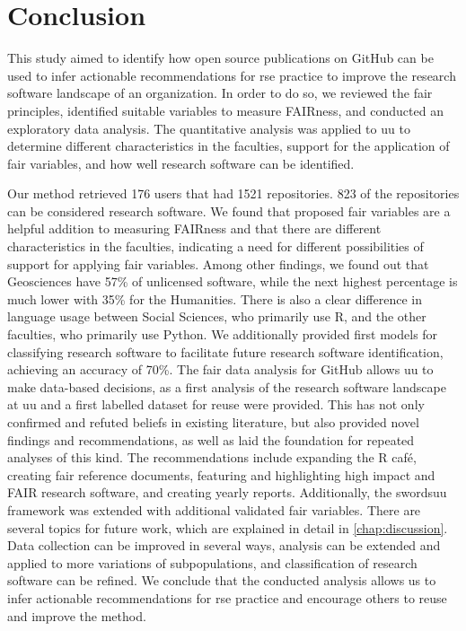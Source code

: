 \titlespacing{\chapter}{0pt}{-60pt}{0pt}
\chapter{Conclusion}
\label{chap:conclusion}
\enlargethispage{\baselineskip}
This study aimed to identify how open source publications on GitHub can be used to infer actionable recommendations for \acrshort{rse} practice to improve the research software landscape of an organization. 
In order to do so, we reviewed the \acrshort{fair} principles, identified suitable variables to measure FAIRness, and conducted an exploratory data analysis.
The quantitative analysis was applied to \acrshort{uu} to determine different characteristics in the faculties, support for the application of \acrshort{fair} variables, and how well research software can be identified. 

Our method retrieved 176 users that had 1521 repositories. 823 of the repositories can be considered research software.
We found that proposed \acrshort{fair} variables are a helpful addition to measuring FAIRness and that there are different characteristics in the faculties, indicating a need for different possibilities of support for applying \acrshort{fair} variables. 
Among other findings, we found out that Geosciences have 57\% of unlicensed software, while the next highest percentage is much lower with 35\% for the Humanities. There is also a clear difference in language usage between Social Sciences, who primarily use R, and the other faculties, who primarily use Python.
We additionally provided first models for classifying research software to facilitate future research software identification, achieving an accuracy of 70\%.
The \acrshort{fair} data analysis for GitHub allows \acrshort{uu} to make data-based decisions, as a first analysis of the research software landscape at \acrshort{uu} and a first labelled dataset for reuse were provided.
This has not only confirmed and refuted beliefs in existing literature, but also provided novel findings and recommendations, as well as laid the foundation for repeated analyses of this kind. The recommendations include expanding the R café, creating \acrshort{fair} reference documents, featuring and highlighting high impact and FAIR research software, and creating yearly reports.
Additionally, the \acrshort{swordsuu} framework was extended with additional validated  \acrshort{fair} variables. 
There are several topics for future work, which are explained in detail in \autoref{chap:discussion}. Data collection can be improved in several ways, analysis can be extended and applied to more variations of subpopulations, and classification of research software can be refined.
We conclude that the conducted analysis allows us to infer actionable recommendations for \acrshort{rse} practice and encourage others to reuse and improve the method.



\titlespacing{\chapter}{0pt}{-50pt}{0pt}